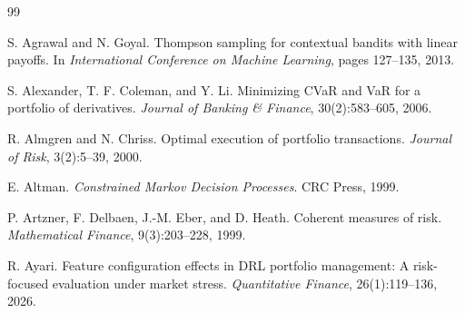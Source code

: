 \documentclass[10pt,twocolumn]{article}
\begin{document}
\clearpage
\begin{thebibliography}{99}

S. Agrawal and N. Goyal.
\newblock Thompson sampling for contextual bandits with linear payoffs.
\newblock In \emph{International Conference on Machine Learning}, pages 127--135, 2013.


S. Alexander, T. F. Coleman, and Y. Li.
\newblock Minimizing CVaR and VaR for a portfolio of derivatives.
\newblock \emph{Journal of Banking \& Finance}, 30(2):583--605, 2006.


R. Almgren and N. Chriss.
\newblock Optimal execution of portfolio transactions.
\newblock \emph{Journal of Risk}, 3(2):5--39, 2000.


E. Altman.
\newblock \emph{Constrained Markov Decision Processes}.
\newblock CRC Press, 1999.


P. Artzner, F. Delbaen, J.-M. Eber, and D. Heath.
\newblock Coherent measures of risk.
\newblock \emph{Mathematical Finance}, 9(3):203--228, 1999.


R. Ayari.
\newblock Feature configuration effects in DRL portfolio management: A
  risk-focused evaluation under market stress.
\newblock \emph{Quantitative Finance}, 26(1):119--136, 2026.


\end{thebibliography}
\end{document}
